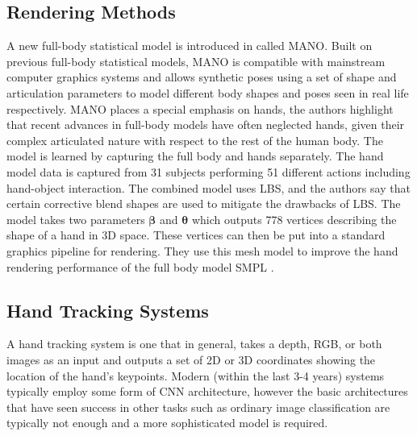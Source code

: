 \subsection{Rendering Methods}
A new full-body statistical model is introduced in \cite{romero2017embodied} called MANO. Built on previous full-body statistical models, MANO is compatible with mainstream computer graphics systems and allows synthetic poses using a set of shape and articulation parameters to model different body shapes and poses seen in real life respectively. MANO places a special emphasis on hands, the authors highlight that recent advances in full-body models have often neglected hands, given their complex articulated nature with respect to the rest of the human body. The model is learned by capturing the full body and hands separately. The hand model data is captured from 31 subjects performing 51 different actions including hand-object interaction. The combined model uses LBS, and the authors say that certain corrective blend shapes are used to mitigate the drawbacks of LBS. The model takes two parameters $\bm{\beta}$ and $\bm{\theta}$ which outputs 778 vertices describing the shape of a hand in 3D space. These vertices can then be put into a standard graphics pipeline for rendering. They use this mesh model to improve the hand rendering performance of the full body model SMPL \cite{loper2015smpl}.

\subsection{Hand Tracking Systems}
A hand tracking system is one that in general, takes a depth, RGB, or both images as an input and outputs a set of 2D or 3D coordinates showing the location of the hand's keypoints. Modern (within the last 3-4 years) systems typically employ some form of CNN architecture, however the basic architectures that have seen success in other tasks such as ordinary image classification are typically not enough and a more sophisticated model is required.

